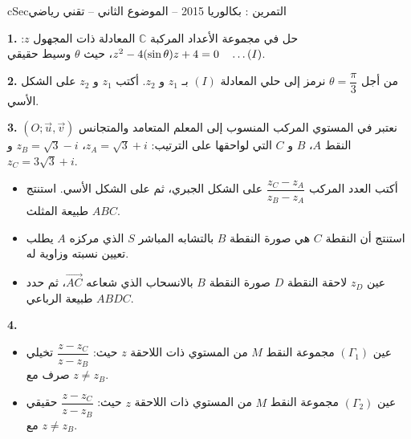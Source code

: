 \documentclass[12pt,a4paper]{article}
\newenvironment{BOX}[2]{\begin{otherlanguage}{english}\begin{arbox}{#1}{#2}}{\end{arbox}\end{otherlanguage}}
\newcounter{exo}
\newenvironment{tamrin}[1]{\stepcounter{exo}\begin{BOX}{cSec}{التمرين \theexo: #1}}{\end{BOX}}
\renewcommand{\dots}{\mathinner{\ldotp\ldotp\ldotp}}
\newenvironment{sq}{\begin{itemize}[leftmargin=2.4em,itemsep=3pt]}{\end{itemize}}
\newcommand{\qa}{\item[(أ)]}\newcommand{\qb}{\item[(ب)]}\newcommand{\qc}{\item[(جـ)]}\newcommand{\qd}{\item[(د)]}\newcommand{\qe}{\item[(هـ)]}
\newcommand{\QQ}[1]{\par\smallskip\textbf{#1.} }
\begin{document}
\begin{tamrin}{بكالوريا 2015 -- الموضوع الثاني -- تقني رياضي}
\QQ{1} حل في مجموعة الأعداد المركبة $\mathbb{C}$ المعادلة ذات المجهول $z$: $z^2-4(\sin\theta)z+4=0\quad\dots(I)$، حيث $\theta$ وسيط حقيقي.

\QQ{2} من أجل $\theta=\dfrac{\pi}{3}$ نرمز إلى حلي المعادلة $(I)$ بـ $z_1$ و $z_2$. أكتب $z_1$ و $z_2$ على الشكل الأسي.

\QQ{3} نعتبر في المستوي المركب المنسوب إلى المعلم المتعامد والمتجانس $(O;\vec u,\vec v)$ النقط $A$، $B$ و $C$ التي لواحقها على الترتيب: $z_A=\sqrt3+i$، $z_B=\sqrt3-i$ و $z_C=3\sqrt3+i$.
\begin{sq}
\qa أكتب العدد المركب $\dfrac{z_C-z_A}{z_B-z_A}$ على الشكل الجبري، ثم على الشكل الأسي. استنتج طبيعة المثلث $ABC$.
\qb استنتج أن النقطة $C$ هي صورة النقطة $B$ بالتشابه المباشر $S$ الذي مركزه $A$ يطلب تعيين نسبته وزاوية له.
\qc عين $z_D$ لاحقة النقطة $D$ صورة النقطة $B$ بالانسحاب الذي شعاعه $\overrightarrow{AC}$، ثم حدد طبيعة الرباعي $ABDC$.
\end{sq}
\QQ{4}
\begin{sq}
\qa عين $(\Gamma_1)$ مجموعة النقط $M$ من المستوي ذات اللاحقة $z$ حيث: $\dfrac{z-z_C}{z-z_B}$ تخيلي صرف مع $z\neq z_B$.
\qb عين $(\Gamma_2)$ مجموعة النقط $M$ من المستوي ذات اللاحقة $z$ حيث: $\dfrac{z-z_C}{z-z_B}$ حقيقي مع $z\neq z_B$.
\end{sq}
\end{tamrin}
\end{document}
